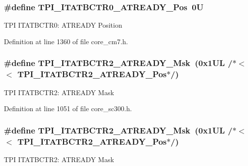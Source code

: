 \subsubsection[{\texorpdfstring{T\+P\+I\+\_\+\+I\+T\+A\+T\+B\+C\+T\+R0\+\_\+\+A\+T\+R\+E\+A\+D\+Y\+\_\+\+Pos}{TPI_ITATBCTR0_ATREADY_Pos}}]{\setlength{\rightskip}{0pt plus 5cm}\#define T\+P\+I\+\_\+\+I\+T\+A\+T\+B\+C\+T\+R0\+\_\+\+A\+T\+R\+E\+A\+D\+Y\+\_\+\+Pos~0U}\hypertarget{group___c_m_s_i_s___t_p_i_gab1eb6866c65f02fa9c83696b49b0f346}{}\label{group___c_m_s_i_s___t_p_i_gab1eb6866c65f02fa9c83696b49b0f346}
T\+PI I\+T\+A\+T\+B\+C\+T\+R0\+: A\+T\+R\+E\+A\+DY Position 

Definition at line 1360 of file core\+\_\+cm7.\+h.

\subsubsection[{\texorpdfstring{T\+P\+I\+\_\+\+I\+T\+A\+T\+B\+C\+T\+R2\+\_\+\+A\+T\+R\+E\+A\+D\+Y\+\_\+\+Msk}{TPI_ITATBCTR2_ATREADY_Msk}}]{\setlength{\rightskip}{0pt plus 5cm}\#define T\+P\+I\+\_\+\+I\+T\+A\+T\+B\+C\+T\+R2\+\_\+\+A\+T\+R\+E\+A\+D\+Y\+\_\+\+Msk~(0x1\+U\+L /$\ast$$<$$<$ T\+P\+I\+\_\+\+I\+T\+A\+T\+B\+C\+T\+R2\+\_\+\+A\+T\+R\+E\+A\+D\+Y\+\_\+\+Pos$\ast$/)}\hypertarget{group___c_m_s_i_s___t_p_i_ga1859502749709a2e5ead9a2599d998db}{}\label{group___c_m_s_i_s___t_p_i_ga1859502749709a2e5ead9a2599d998db}
T\+PI I\+T\+A\+T\+B\+C\+T\+R2\+: A\+T\+R\+E\+A\+DY Mask 

Definition at line 1051 of file core\+\_\+sc300.\+h.

\subsubsection[{\texorpdfstring{T\+P\+I\+\_\+\+I\+T\+A\+T\+B\+C\+T\+R2\+\_\+\+A\+T\+R\+E\+A\+D\+Y\+\_\+\+Msk}{TPI_ITATBCTR2_ATREADY_Msk}}]{\setlength{\rightskip}{0pt plus 5cm}\#define T\+P\+I\+\_\+\+I\+T\+A\+T\+B\+C\+T\+R2\+\_\+\+A\+T\+R\+E\+A\+D\+Y\+\_\+\+Msk~(0x1\+U\+L /$\ast$$<$$<$ T\+P\+I\+\_\+\+I\+T\+A\+T\+B\+C\+T\+R2\+\_\+\+A\+T\+R\+E\+A\+D\+Y\+\_\+\+Pos$\ast$/)}\hypertarget{group___c_m_s_i_s___t_p_i_ga1859502749709a2e5ead9a2599d998db}{}\label{group___c_m_s_i_s___t_p_i_ga1859502749709a2e5ead9a2599d998db}
T\+PI I\+T\+A\+T\+B\+C\+T\+R2\+: A\+T\+R\+E\+A\+DY Mask 

